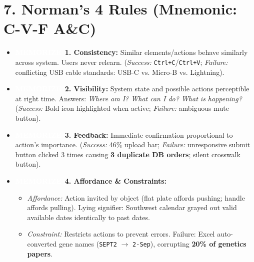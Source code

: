 \documentclass[8.5pt,a4paper,twocolumn]{article}
\newcommand{\tagmem}{\colorbox{accentred}{\textcolor{white}{\bfseries\fontsize{5.5pt}{6.5pt}\selectfont MEMORIZE}}\ }
\begin{document}
\section*{7. Norman's 4 Rules (Mnemonic: C-V-F A\&C)}
\begin{itemize}[leftmargin=7pt, itemsep=1pt, topsep=0.5pt]
    \item \tagmem \textbf{1. Consistency:} Similar elements/actions behave similarly across system. Users never relearn. (\textit{Success:} \texttt{Ctrl+C}/\texttt{Ctrl+V}; \textit{Failure:} conflicting USB cable standards: USB-C vs. Micro-B vs. Lightning).
    \item \tagmem \textbf{2. Visibility:} System state and possible actions perceptible at right time. Answers: \textit{Where am I? What can I do? What is happening?} (\textit{Success:} Bold icon highlighted when active; \textit{Failure:} ambiguous mute button).
    \item \tagmem \textbf{3. Feedback:} Immediate confirmation proportional to action's importance. (\textit{Success:} 46\% upload bar; \textit{Failure:} unresponsive submit button clicked 3 times causing \textbf{3 duplicate DB orders}; silent crosswalk button).
    \item \tagmem \textbf{4. Affordance \& Constraints:}
    \begin{itemize}[leftmargin=6pt, itemsep=0.5pt]
        \item \textit{Affordance:} Action invited by object (flat plate affords pushing; handle affords pulling). Lying signifier: Southwest calendar grayed out valid available dates identically to past dates.
        \item \textit{Constraint:} Restricts actions to prevent errors. Failure: Excel auto-converted gene names (\texttt{SEPT2} $\rightarrow$ \texttt{2-Sep}), corrupting \textbf{20\% of genetics papers}.
    \end{itemize}
\end{itemize}
\end{document}
